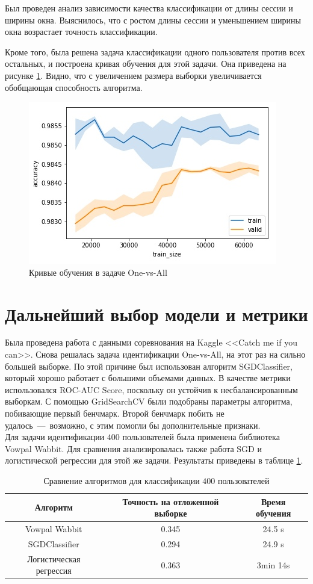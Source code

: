 \documentclass[12pt,a4paper]{article}
\theoremstyle{plain}
\theoremstyle{definition}
\theoremstyle{remark}
\renewcommand{\%}[1]{\,\text{mod} \,#1}
\begin{document}
	Был проведен анализ зависимости качества классификации от длины сессии и ширины окна. Выяснилось, что с ростом длины сессии и уменьшением ширины окна возрастает точность классификации. 
	
	Кроме того, была решена задача классификации одного пользователя против всех остальных, и построена кривая обучения для этой задачи. Она приведена на рисунке \ref{pic2}. Видно, что с увеличением размера выборки увеличивается обобщающая способность алгоритма.
	\begin{figure}[h!]
		\centering
		\includegraphics[scale=0.7]{pic2.jpg}
		\caption{Кривые обучения в задаче One-vs-All}\label{pic2}
	\end{figure}
	\section{Дальнейший выбор модели и метрики}
	Была проведена работа с данными соревнования на Kaggle <<Catch me if you can>>. Снова решалась задача идентификации One-vs-All, на этот раз на сильно большей выборке. По этой причине был использован алгоритм SGDClassifier, который хорошо работает с большими объемами данных. В качестве метрики использовался ROC-AUC Score, поскольку он устойчив к несбалансированным выборкам. С помощью GridSearchCV были подобраны параметры алгоритма, побивающие первый бенчмарк. Второй бенчмарк побить не удалось~---~возможно, с этим помогли бы дополнительные признаки. \\
	Для задачи идентификации $400$ пользователей была применена библиотека Vowpal Wabbit. Для сравнения анализировалась также работа SGD и логистической регрессии для этой же задачи. Результаты приведены в таблице \ref{table2}.
	\begin{table}[h!]
		\centering
		\begin{tabular}{|c|c|c|}
			\hline
			Алгоритм                & Точность на отложенной выборке & Время обучения \\ \hline
			Vowpal Wabbit           & 0.345                          & 24.5 s         \\ \hline
			SGDClassifier           & 0.294                          & 24.9 s         \\ \hline
			Логистическая регрессия & 0.363                          & 3min 14s       \\ \hline
		\end{tabular}
	\caption{Сравнение алгоритмов для классификации $400$ пользователей}\label{table2}
	\end{table}
\end{document}
